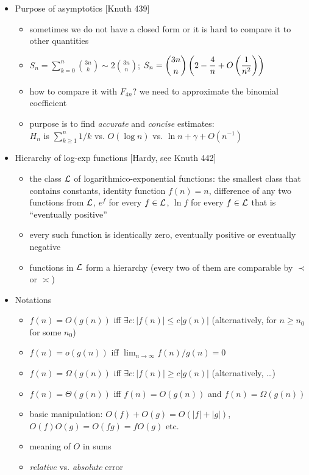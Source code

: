 \documentclass[10pt, a4paper]{article}
\begin{document}
\begin{itemize}
\item
Purpose of asymptotics [Knuth 439]
\begin{itemize}
    \item sometimes we do not have a closed form or it is hard to compare it to other quantities
    \item $\displaystyle S_n = \sum_{k=0}^n {3n\choose k}\sim 2{3n\choose n}$; $\displaystyle S_n = {3n\choose n}\left(2-{4\over n} + O\left({1\over n^2}\right)\right)$
    \item how to compare it with $F_{4n}$? we need to approximate the binomial coefficient
    \item purpose is to find \emph{accurate} and \emph{concise} estimates:\\
            $H_n$ is $\sum_{k\ge 1}^n 1/k$ vs. $O(\log n)$ vs. $\ln n + \gamma + O(n^{-1})$ 
\end{itemize}

\item
Hierarchy of log-exp functions [Hardy, see Knuth 442]
\begin{itemize}
    \item the class $\cal L$ of logarithmico-exponential functions:
            the smallest class that contains constants, identity function $f(n) = n$,
            difference of any two functions from $\cal L$,
            $e^f$ for every $f\in {\cal L}$, $\ln f$ for every $f\in {\cal L}$ that is ``eventually positive''
    \item every such function is identically zero, eventually positive or eventually negative
    \item functions in $\cal L$ form a hierarchy (every two of them are comparable by $\prec$ or $\asymp$)
\end{itemize}

\item
Notations
\begin{itemize}
    \item $f(n) = O(g(n))$ iff $\exists c: |f(n)|\le c|g(n)|$ (alternatively, for $n\ge n_0$ for some $n_0$)
    \item $f(n) = o(g(n))$ iff $\lim_{n\to\infty} f(n)/g(n) = 0$
    \item $f(n) = \Omega(g(n))$ iff $\exists c: |f(n)|\ge c|g(n)|$ (alternatively, \dots)
    \item $f(n) = \Theta(g(n))$ iff $f(n) = O(g(n))$ and $f(n) = \Omega(g(n))$
    \item basic manipulation: $O(f)+O(g) = O(|f|+|g|)$, $O(f)O(g)=O(fg)=fO(g)$ etc.
    \item meaning of $O$ in sums
    \item \emph{relative} vs. \emph{absolute} error
\end{itemize}


\end{itemize}
\end{document}

